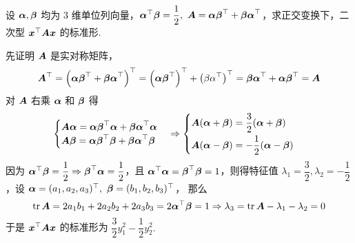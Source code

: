 \begin{example}
    设 $\vb*{\alpha},\vb*{\beta}$ 均为 3 维单位列向量，$\vb*{\alpha}^\top\vb*{\beta}=\dfrac{1}{2},~\vb*{A}=\vb*{\alpha\beta}^\top+\vb*{\beta\alpha}^\top$，求正交变换下，二次型 $\vb*{x}^\top\vb*{Ax}$ 的标准形.
\end{example}
\begin{solution}
    先证明 $\vb*{A}$ 是实对称矩阵，
    $$\vb*{A}^\top=\qty(\vb*{\alpha\beta}^\top+\vb*{\beta\alpha}^\top)^\top=\qty(\vb*{\alpha\beta}^\top)^\top+\qty(\beta\alpha^\top)^\top=\vb*{\beta\alpha}^\top+\vb*{\alpha\beta}^\top=\vb*{A}$$
    对 $\vb*{A}$ 右乘 $\vb*{\alpha}$ 和 $\vb*{\beta}$ 得
    $$\begin{cases}
            \vb*{A\alpha}=\vb*{\alpha\beta}^\top\vb*{\alpha}+\vb*{\beta\alpha}^\top\vb*{\alpha} \\
            \vb*{A\beta}=\vb*{\alpha\beta}^\top\vb*{\beta}+\vb*{\beta\alpha}^\top\vb*{\beta}
        \end{cases}\Rightarrow\begin{cases}
            \vb*{A}(\vb*{\alpha}+\vb*{\beta})=\dfrac{3}{2}(\vb*{\alpha}+\vb*{\beta}) \\[6pt]
            \vb*{A}(\vb*{\alpha}-\vb*{\beta})=-\dfrac{1}{2}(\vb*{\alpha}-\vb*{\beta})
        \end{cases}$$
    因为 $\vb*{\alpha}^\top\vb*{\beta}=\dfrac{1}{2}\Rightarrow\vb*{\beta}^\top\vb*{\alpha}=\dfrac{1}{2}$，且 $\vb*{\alpha}^\top\vb*{\alpha}=\vb*{\beta}^\top\vb*{\beta}=1$，则得特征值
    $\lambda_1=\dfrac{3}{2},\lambda_2=-\dfrac{1}{2}$，设 $\vb*{\alpha}=(a_1,a_2,a_3)^\top,~\vb*{\beta}=(b_1,b_2,b_3)^\top$，
    那么 $$\tr\vb*{A}=2a_1b_1+2a_2b_2+2a_3b_3=2\vb*{\alpha}^\top\vb*{\beta}=1\Rightarrow \lambda_3=\tr\vb*{A}-\lambda_1-\lambda_2=0$$
    于是 $\vb*{x}^\top\vb*{Ax}$ 的标准形为 $\dfrac{3}{2}y_1^2-\dfrac{1}{2}y_2^2.$
\end{solution}

